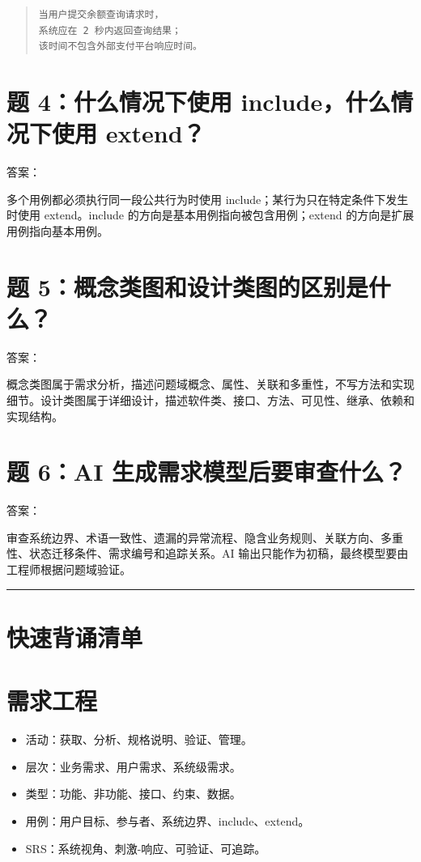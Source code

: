\documentclass[UTF8,zihao=-4]{ctexart}
\begin{document}
\begin{quote}
\footnotesize
\begin{verbatim}
当用户提交余额查询请求时，
系统应在 2 秒内返回查询结果；
该时间不包含外部支付平台响应时间。
\end{verbatim}
\end{quote}

\section{题 4：什么情况下使用 include，什么情况下使用 extend？}

答案：

多个用例都必须执行同一段公共行为时使用 include；某行为只在特定条件下发生时使用 extend。include 的方向是基本用例指向被包含用例；extend 的方向是扩展用例指向基本用例。

\section{题 5：概念类图和设计类图的区别是什么？}

答案：

概念类图属于需求分析，描述问题域概念、属性、关联和多重性，不写方法和实现细节。设计类图属于详细设计，描述软件类、接口、方法、可见性、继承、依赖和实现结构。

\section{题 6：AI 生成需求模型后要审查什么？}

答案：

审查系统边界、术语一致性、遗漏的异常流程、隐含业务规则、关联方向、多重性、状态迁移条件、需求编号和追踪关系。AI 输出只能作为初稿，最终模型要由工程师根据问题域验证。

\bigskip\hrule\bigskip

\section{快速背诵清单}

\section{需求工程}

\begin{itemize}
\item 活动：获取、分析、规格说明、验证、管理。
\item 层次：业务需求、用户需求、系统级需求。
\item 类型：功能、非功能、接口、约束、数据。
\item 用例：用户目标、参与者、系统边界、include、extend。
\item SRS：系统视角、刺激-响应、可验证、可追踪。
\end{itemize}
\end{document}
